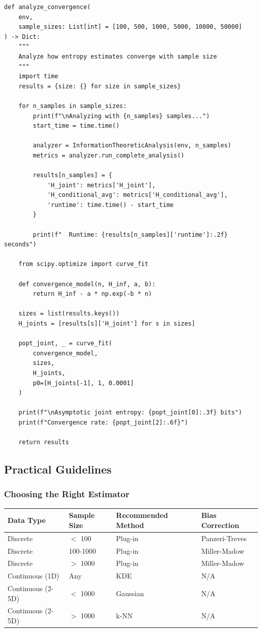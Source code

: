 \documentclass[10pt, letterpaper]{article}
\begin{document}
\begin{lstlisting}
def analyze_convergence(
    env,
    sample_sizes: List[int] = [100, 500, 1000, 5000, 10000, 50000]
) -> Dict:
    """
    Analyze how entropy estimates converge with sample size
    """
    import time
    results = {size: {} for size in sample_sizes}

    for n_samples in sample_sizes:
        print(f"\nAnalyzing with {n_samples} samples...")
        start_time = time.time()

        analyzer = InformationTheoreticAnalysis(env, n_samples)
        metrics = analyzer.run_complete_analysis()

        results[n_samples] = {
            'H_joint': metrics['H_joint'],
            'H_conditional_avg': metrics['H_conditional_avg'],
            'runtime': time.time() - start_time
        }

        print(f"  Runtime: {results[n_samples]['runtime']:.2f} seconds")

    from scipy.optimize import curve_fit

    def convergence_model(n, H_inf, a, b):
        return H_inf - a * np.exp(-b * n)

    sizes = list(results.keys())
    H_joints = [results[s]['H_joint'] for s in sizes]

    popt_joint, _ = curve_fit(
        convergence_model,
        sizes,
        H_joints,
        p0=[H_joints[-1], 1, 0.0001]
    )

    print(f"\nAsymptotic joint entropy: {popt_joint[0]:.3f} bits")
    print(f"Convergence rate: {popt_joint[2]:.6f}")

    return results
\end{lstlisting}

\subsection{Practical Guidelines}

\subsubsection{Choosing the Right Estimator}

\begin{center}
\begin{tabular}{llll}
\toprule
\textbf{Data Type} & \textbf{Sample Size} & \textbf{Recommended Method} & \textbf{Bias Correction} \\
\midrule
Discrete & $<$ 100 & Plug-in & Panzeri-Treves \\
Discrete & 100-1000 & Plug-in & Miller-Madow \\
Discrete & $>$ 1000 & Plug-in & Miller-Madow \\
Continuous (1D) & Any & KDE & N/A \\
Continuous (2-5D) & $<$ 1000 & Gaussian & N/A \\
Continuous (2-5D) & $>$ 1000 & k-NN & N/A \\
\bottomrule
\end{tabular}
\end{center}
\end{document}
